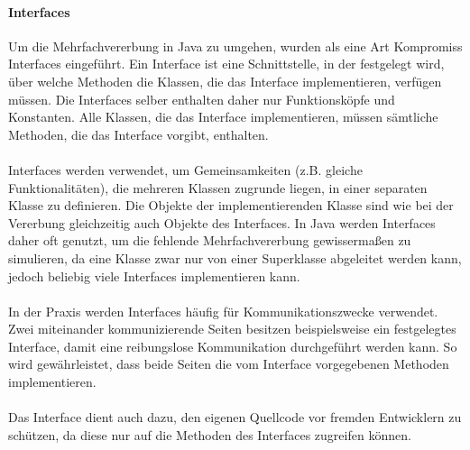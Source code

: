 \paragraph{Interfaces}
Um die Mehrfachvererbung in Java zu umgehen, wurden als eine Art Kompromiss Interfaces eingeführt. Ein Interface ist eine Schnittstelle, in der festgelegt wird, über welche Methoden die Klassen, die das Interface implementieren, verfügen müssen. Die Interfaces selber enthalten daher nur Funktionsköpfe und Konstanten. Alle Klassen, die das Interface implementieren, müssen sämtliche Methoden, die das Interface vorgibt, enthalten.\\
\\
Interfaces werden verwendet, um Gemeinsamkeiten (z.B. gleiche Funktionalitäten), die mehreren Klassen zugrunde liegen, in einer separaten Klasse zu definieren. Die Objekte der implementierenden Klasse sind wie bei der Vererbung gleichzeitig auch Objekte des Interfaces. In Java werden Interfaces daher oft genutzt, um die fehlende Mehrfachvererbung gewissermaßen zu simulieren, da eine Klasse zwar nur von einer Superklasse abgeleitet werden kann, jedoch beliebig viele Interfaces implementieren kann.\\
\\
In der Praxis werden Interfaces häufig für Kommunikationszwecke verwendet. Zwei miteinander kommunizierende Seiten besitzen beispielsweise ein festgelegtes Interface, damit eine reibungslose Kommunikation durchgeführt werden kann. So wird gewährleistet, dass beide Seiten die vom Interface vorgegebenen Methoden implementieren.\\
\\
Das Interface dient auch dazu, den eigenen Quellcode vor fremden Entwicklern zu schützen, da diese nur auf die Methoden des Interfaces zugreifen können.


